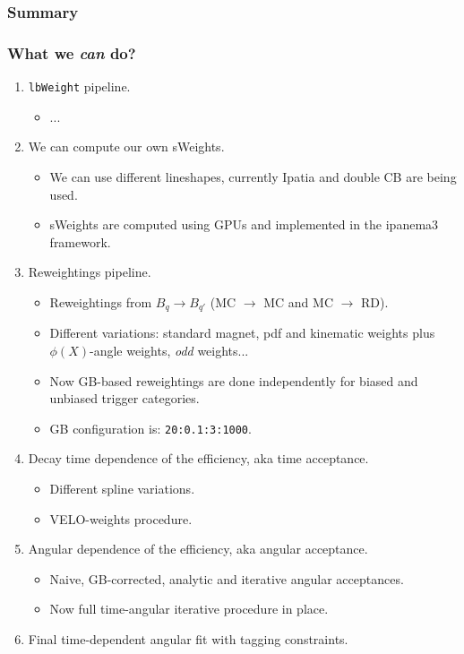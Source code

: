 \documentclass[9pt,aspectratio=43]{beamer}
\begin{document}
%
\begin{frame}[default]
\frametitle{Summary}
\frametitle{What we \textit{can} do?}

\begin{enumerate}
	\item \texttt{lbWeight} pipeline.
    \begin{itemize}
      \item ...
    \end{itemize}
  \item We can compute our own sWeights.
    \begin{itemize}
      \item We can use different lineshapes, currently Ipatia and double CB are being used.
      \item sWeights are computed using GPUs and implemented in the ipanema3 framework.
    \end{itemize}
  \item Reweightings pipeline.
    \begin{itemize}
      \item Reweightings from $B_q \rightarrow B_{q'}$ (MC $\rightarrow$ MC and MC $\rightarrow$ RD).
      \item Different variations: standard magnet, pdf and kinematic weights plus $\phi(X)$-angle weights, \textit{odd} weights...
      \item Now GB-based reweightings are done independently for biased and unbiased trigger categories.
      \item GB configuration is: \texttt{20:0.1:3:1000}.
    \end{itemize}
  \addtocounter{enumi}{1}
  \item Decay time dependence of the efficiency, aka time acceptance.
    \begin{itemize}
      \item Different spline variations.
      \item VELO-weights procedure.
    \end{itemize}
  \addtocounter{enumi}{2}
  \item Angular dependence of the efficiency, aka angular acceptance.
    \begin{itemize}
      \item Naive, GB-corrected, analytic and iterative angular acceptances.
      \item Now full time-angular iterative procedure in place.
    \end{itemize}
  \item Final time-dependent angular fit with tagging constraints.
\end{enumerate}

\end{frame}
%
\end{document}
